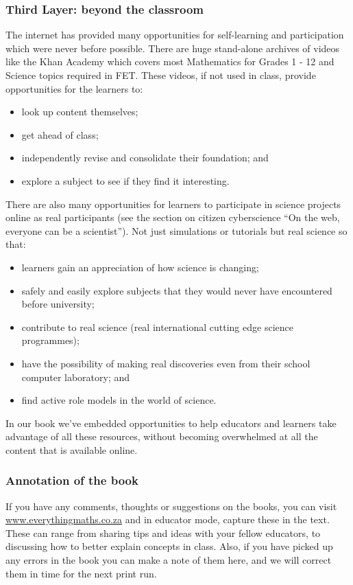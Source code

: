 \subsubsection{Third Layer: beyond the classroom}
The internet has provided many opportunities for self-learning and participation which were never before possible. There are huge stand-alone archives of videos like the Khan Academy which covers most Mathematics for Grades 1 - 12 and Science topics required in FET. These videos, if not used in class, provide opportunities for the learners to:
\begin{itemize}[noitemsep]
\item look up content themselves;
\item get ahead of class;
\item independently revise and consolidate their foundation; and
\item explore a subject to see if they find it interesting.
\end{itemize}
There are also many opportunities for learners to participate in science projects online as real participants (see the section on citizen cyberscience “On the web, everyone can be a scientist”). Not just simulations or tutorials but real science so that:
\begin{itemize}[noitemsep]
\item learners gain an appreciation of how science is changing;
\item safely and easily explore subjects that they would never have encountered before university;
\item contribute to real science (real international cutting edge science programmes);
\item have the possibility of making real discoveries even from their school computer laboratory; and
\item find active role models in the world of science.
\end{itemize}
In our book we've embedded opportunities to help educators and learners take advantage of all these resources, without becoming overwhelmed at all the content that is available online. 

\subsubsection{Annotation of the book}
If you have any comments, thoughts or suggestions on the books, you can visit  \url{www.everythingmaths.co.za} and in educator mode, capture these in the text. These can range from sharing tips and ideas with your fellow educators, to discussing how to better explain concepts in class. Also, if you have picked up any errors in the book you can make a note of them here, and we will correct them in time for the next print run.\par

